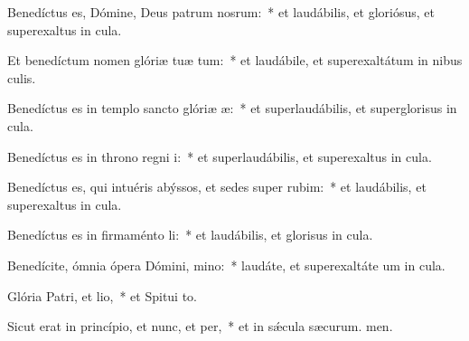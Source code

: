\item Benedíctus es, Dómine, Deus patrum nosrum:~* et laudábilis, et gloriósus, et superexaltus in cula.

\item Et benedíctum nomen glóriæ tuæ tum:~* et laudábile, et superexaltátum in nibus culis.

\item Benedíctus es in templo sancto glóriæ æ:~* et superlaudábilis, et superglorisus in cula.

\item Benedíctus es in throno regni i:~* et superlaudábilis, et superexaltus in cula.

\item Benedíctus es, qui intuéris abýssos, et sedes super rubim:~* et laudábilis, et superexaltus in cula.

\item Benedíctus es in firmaménto li:~* et laudábilis, et glorisus in cula.

\item Benedícite, ómnia ópera Dómini, mino:~* laudáte, et superexaltáte um in cula.

\item Glória Patri, et lio,~* et Spitui to.

\item Sicut erat in princípio, et nunc, et per,~* et in sǽcula sæcurum. men.